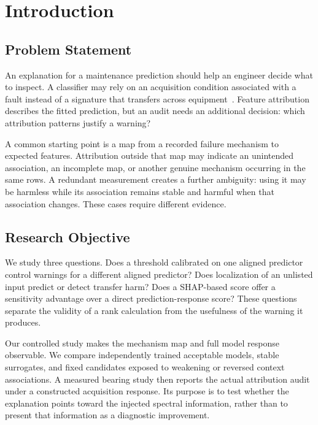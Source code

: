 \documentclass[conference]{IEEEtran}
\begin{document}
\section{Introduction}
\label{sec:introduction}
\subsection{Problem Statement}
An explanation for a maintenance prediction should help an engineer decide what to inspect. A classifier may rely on an acquisition condition associated with a fault instead of a signature that transfers across equipment~\cite{geirhos2020shortcut,lapuschkin2019unmasking}. Feature attribution describes the fitted prediction, but an audit needs an additional decision: which attribution patterns justify a warning?

A common starting point is a map from a recorded failure mechanism to expected features. Attribution outside that map may indicate an unintended association, an incomplete map, or another genuine mechanism occurring in the same rows. A redundant measurement creates a further ambiguity: using it may be harmless while its association remains stable and harmful when that association changes. These cases require different evidence.

\subsection{Research Objective}
We study three questions. Does a threshold calibrated on one aligned predictor control warnings for a different aligned predictor? Does localization of an unlisted input predict or detect transfer harm? Does a SHAP-based score offer a sensitivity advantage over a direct prediction-response score? These questions separate the validity of a rank calculation from the usefulness of the warning it produces.

Our controlled study makes the mechanism map and full model response observable. We compare independently trained acceptable models, stable surrogates, and fixed candidates exposed to weakening or reversed context associations. A measured bearing study then reports the actual attribution audit under a constructed acquisition response. Its purpose is to test whether the explanation points toward the injected spectral information, rather than to present that information as a diagnostic improvement.
\end{document}

